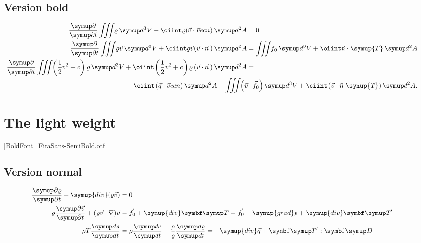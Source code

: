 \documentclass[english,log-declarations=false]{article}
\begin{document}
\subsection{Version bold}

\setBold

\begin{align}
 \Q{}{t}\iiint\<\varrho\diff^3V+\oiint\varrho(\vec{v}\cdot\vec{v}ec{n})\diff^2A          &= 0\\
 \Q{}{t}\iiint\<\varrho\vec{v}\diff^3V+\oiint\varrho\vec{v}(\vec{v}\cdot\vec{n}\,)\diff^2A &=
        \iiint\<f_0\diff^3V+\oiint\vec{n}\cdot\symup{T}\diff^2A \\
 \Q{}{t}\iiint\<\left(\half v^2+e\right)\varrho\diff^3V+\oiint\left(\half v^2+e\right)
        \varrho\left(\vec{v}\cdot\vec{n}\,\right)\diff^2A                                & =\\
 \multispan2{\hfill${\displaystyle-\oiint\left(\vec{q}\cdot\vec{v}ec{n}\right)\diff^2A+
         \iiint\<\left(\vec{v}\cdot\vec{f}_0\right)\diff^3V+\oiint\left(\vec{v}
         \cdot\vec{n}~\symup{T}\right)\diff^2A}$}.\nonumber
\end{align}

\unsetBold



\section{The light  weight}

\setsansfont{FiraSans-Light.otf}[BoldFont=FiraSans-SemiBold.otf]

\subsection{Version normal}

\begin{align}
\begin{aligned}
  \Q{\varrho}{t}+\symup{div}(\varrho\vec{v}) &= 0 \\
  \varrho\Q{\vec{v}}{t}+(\varrho\vec{v}\cdot\nabla)\vec{v}   &= \vec{f}_0+\symup{div}\TT=\vec{f}_0
	-\symup{grad}p+\symup{div}\TT' \\
  \varrho T\frac{\diff s}{\diff t}               &= \varrho\frac{\diff e}{\diff t}
    -\frac{p}{\varrho}\frac{\diff\varrho}{\diff t}=-\symup{div}\vec{q}+\TT':\DD 
\end{aligned}
\end{align}
\end{document}
